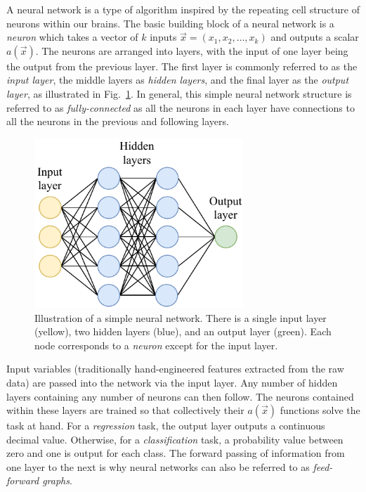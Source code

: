 A neural network is a type of algorithm inspired by the repeating cell structure of neurons within
our brains. The basic building block of a neural network is a \emph{neuron} which takes a vector
of $k$ inputs $\vec{x} = (x_{1}, x_{2},\dots,x_{k})$ and outputs a scalar $a(\vec{x})$. The
neurons are arranged into layers, with the input of one layer being the output from the previous
layer. The first layer is commonly referred to as the \emph{input layer}, the middle layers as
\emph{hidden layers}, and the final layer as the \emph{output layer}, as illustrated in
Fig.~\ref{fig:network}. In general, this simple neural network structure is referred to as
\emph{fully-connected} as all the neurons in each layer have connections to all the neurons in the
previous and following layers.

\begin{figure} %
    \includegraphics[width=0.7\textwidth]{diagrams/6-cvn/network.pdf}
    \caption[Illustration of a simple neural network]
    {Illustration of a simple neural network. There is a single input layer (yellow), two hidden
        layers (blue), and an output layer (green). Each node corresponds to a \emph{neuron}
        except for the input layer.}
    \label{fig:network}
\end{figure}

Input variables (traditionally hand-engineered features extracted from the raw data) are passed
into the network via the input layer. Any number of hidden layers containing any number of neurons
can then follow. The neurons contained within these layers are trained so that collectively their
$a(\vec{x})$ functions solve the task at hand. For a \emph{regression} task, the output layer
outputs a continuous decimal value. Otherwise, for a \emph{classification} task, a probability
value between zero and one is output for each class. The forward passing of information from one
layer to the next is why neural networks can also be referred to as \emph{feed-forward graphs}.


